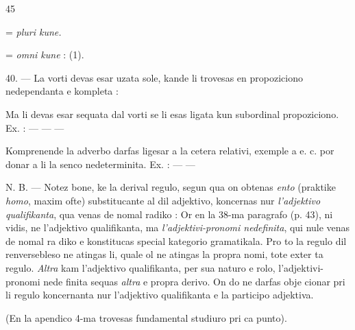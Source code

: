 \begin{VUpage}[49]{45}

 = \textit{pluri kune.}

\VUblancAlinea
{} = \textit{omni kune} : \nl
{} (1).

\VUblanc{6.06pt}%
40. --- La vorti  devas esar\nl
uzata sole, kande li trovesas en propoziciono nedependanta\nl
e kompleta : \nl
{}

\VUblancAlinea
Ma li devas esar sequata dal vorti \nl
{} se li esas ligata kun subordinal propoziciono. Ex. :\nl
{}\nl
{} --- \cc
{} ---  ---\nl
{}

\VUblancAlinea
Komprenende la adverbo  darfas ligesar a la cetera\nl
relativi, exemple a  e. c. por donar a li\nl
la senco nedeterminita. Ex. : \nl
{} --- \nl
{} --- \nl
{}

\VUblancAlinea
N. B. --- Notez bone, ke la derival regulo, segun qua on\nl
obtenas \textit{ento} (praktike \textit{homo}, maxim ofte) substitucante \nl
al  dil adjektivo, koncernas nur \textit{l'adjektivo qualifikanta},\nl
qua venas de nomal radiko :  Or en la 38-ma\nl
paragrafo (p. 43), ni vidis, ne l'adjektivo qualifikanta, ma\nl
\textit{l'adjektivi-pronomi nedefinita}, qui nule venas de nomal ra\cc
diko e konstitucas special kategorio gramatikala. Pro to la\nl
regulo dil renversebleso ne atingas li, quale ol ne atingas\nl
la propra nomi, tote exter ta regulo. \textit{Altra} kam l'adjektivo\nl
qualifikanta, per sua naturo e rolo, l'adjektivi-pronomi nede\cc
finita sequas \textit{altra} e propra derivo. On do ne darfas obje\cc
cionar pri li regulo koncernanta nur l'adjektivo qualifikanta\nl
e la participo adjektiva.

(En la apendico 4-ma trovesas fundamental studiuro pri\nl
ca punto).
\end{VUpage}

